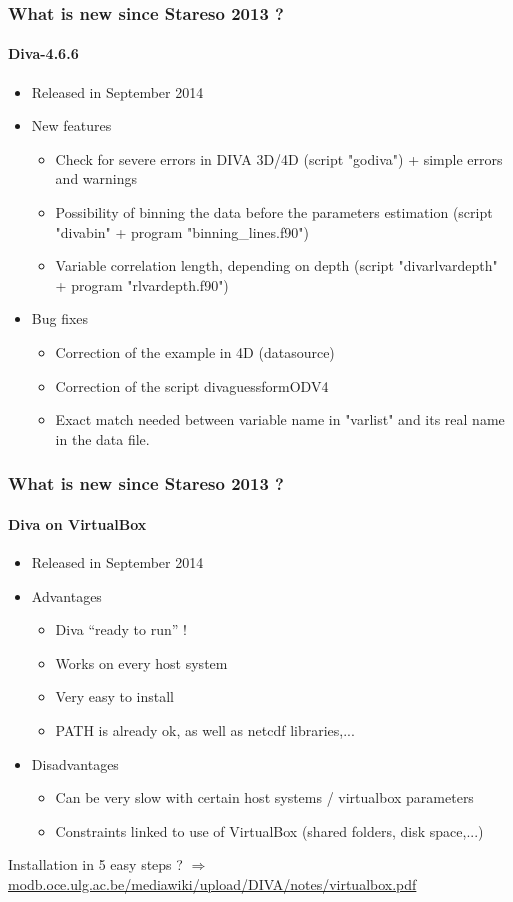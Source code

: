 \begin{frame}
 \frametitle{What is new since Stareso 2013 ?}
 \framesubtitle{Diva-4.6.6}
 \begin{itemize}
  \item Released in September 2014
  \item New features
  \begin{itemize}
   \item Check for severe errors in DIVA 3D/4D (script "godiva") + simple errors and warnings
   \item Possibility of binning the data before the parameters estimation (script "divabin" + program "binning\_lines.f90")
   \item Variable correlation length, depending on depth (script "divarlvardepth" + program "rlvardepth.f90")
  \end{itemize}
  \item Bug fixes
  \begin{itemize}
  \item Correction of the example in 4D (datasource)
  \item Correction of the script divaguessformODV4
  \item Exact match needed between variable name in "varlist" and its real name in the data file.   
  \end{itemize}
  \end{itemize}
\end{frame}
\begin{frame}
 \frametitle{What is new since Stareso 2013 ?}
 \framesubtitle{Diva on VirtualBox}
  \begin{itemize}
   \item Released in September 2014
   \item Advantages
   \begin{itemize}
   \item Diva ``ready to run'' !
   \item Works on every host system
   \item Very easy to install
   \item PATH is already ok, as well as netcdf libraries,...
   \end{itemize}
   \item Disadvantages
   \begin{itemize}
   \item Can be very slow with certain host systems / virtualbox parameters
   \item Constraints linked to use of VirtualBox (shared folders, disk space,...)
   \end{itemize}
   \end{itemize}
  Installation in 5 easy steps ? $\Rightarrow$ \url{modb.oce.ulg.ac.be/mediawiki/upload/DIVA/notes/virtualbox.pdf}
\end{frame}
